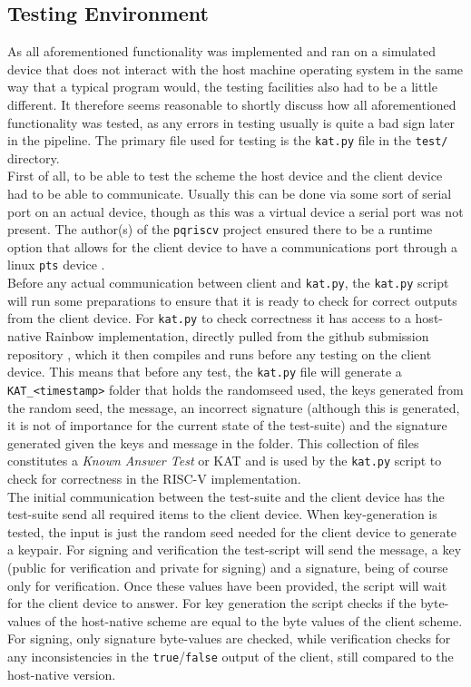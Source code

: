 \subsection{Testing Environment}
As all aforementioned functionality was implemented and ran on a simulated device that does not interact with the host machine operating system in the same way that a typical program would, the testing facilities also had to be a little different. It therefore seems reasonable to shortly discuss how all aforementioned functionality was tested, as any errors in testing usually is quite a bad sign later in the pipeline. The primary file used for testing is the \texttt{kat.py} file in the \texttt{test/} directory.\medskip\\
First of all, to be able to test the scheme the host device and the client device had to be able to communicate. Usually this can be done via some sort of serial port on an actual device, though as this was a virtual device a serial port was not present. The author(s) of the \texttt{pqriscv} project ensured there to be a runtime option that allows for the client device to have a communications port through a linux \texttt{pts} device \cite{pqvex}.\medskip\\
Before any actual communication between client and \texttt{kat.py}, the \texttt{kat.py} script will run some preparations to ensure that it is ready to check for correct outputs from the client device. For \texttt{kat.py} to check correctness it has access to a host-native Rainbow implementation, directly pulled from the github submission repository \cite{rainbowgit}, which it then compiles and runs before any testing on the client device. This means that before any test, the \texttt{kat.py} file will generate a \texttt{KAT\_<timestamp>} folder that holds the randomseed used, the keys generated from the random seed, the message, an incorrect signature (although this is generated, it is not of importance for the current state of the test-suite) and the signature generated given the keys and message in the folder. This collection of files constitutes a \textit{Known Answer Test} or KAT and is used by the \texttt{kat.py} script to check for correctness in the RISC-V implementation.\medskip\\
The initial communication between the test-suite and the client device has the test-suite send all required items to the client device. When key-generation is tested, the input is just the random seed needed for the client device to generate a keypair. For signing and verification the test-script will send the message, a key (public for verification and private for signing) and a signature, being of course only for verification. Once these values have been provided, the script will wait for the client device to answer. For key generation the script checks if the byte-values of the host-native scheme are equal to the byte values of the client scheme. For signing, only signature byte-values are checked, while verification checks for any inconsistencies in the \texttt{true}/\texttt{false} output of the client, still compared to the host-native version.
